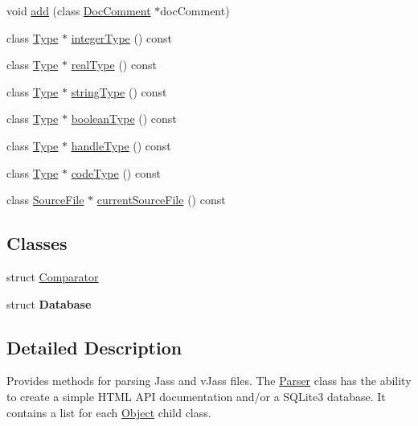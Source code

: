 \begin{CompactItemize}
void \hyperlink{classvjassdoc_1_1Parser_2bb67835019bcb11b1a8cddf6c123a29}{add} (class \hyperlink{classvjassdoc_1_1DocComment}{DocComment} $\ast$docComment)
\item 
class \hyperlink{classvjassdoc_1_1Type}{Type} $\ast$ \hyperlink{classvjassdoc_1_1Parser_b1626fc6672aa818b981e0e4ffc3cd47}{integerType} () const 
\item 
class \hyperlink{classvjassdoc_1_1Type}{Type} $\ast$ \hyperlink{classvjassdoc_1_1Parser_62b691d7ba04b663d6044ede61f4d2dd}{realType} () const 
\item 
class \hyperlink{classvjassdoc_1_1Type}{Type} $\ast$ \hyperlink{classvjassdoc_1_1Parser_3fd0e0dff3afbe71cfd690a3dd872810}{stringType} () const 
\item 
class \hyperlink{classvjassdoc_1_1Type}{Type} $\ast$ \hyperlink{classvjassdoc_1_1Parser_274e561395425aa4286845c2c3b87b69}{booleanType} () const 
\item 
class \hyperlink{classvjassdoc_1_1Type}{Type} $\ast$ \hyperlink{classvjassdoc_1_1Parser_ad227675f854bd07082021316c36b2d1}{handleType} () const 
\item 
class \hyperlink{classvjassdoc_1_1Type}{Type} $\ast$ \hyperlink{classvjassdoc_1_1Parser_afc9cc507b84a07a27dfee8eb1ed896a}{codeType} () const 
\item 
class \hyperlink{classvjassdoc_1_1SourceFile}{SourceFile} $\ast$ \hyperlink{classvjassdoc_1_1Parser_aa986d6eebbef504e87222ff05dc5d33}{currentSourceFile} () const 
\end{CompactItemize}
\subsection*{Classes}
\begin{CompactItemize}
\item 
struct \hyperlink{structvjassdoc_1_1Parser_1_1Comparator}{Comparator}
\item 
struct \textbf{Database}
\end{CompactItemize}


\subsection{Detailed Description}
Provides methods for parsing Jass and vJass files. The \hyperlink{classvjassdoc_1_1Parser}{Parser} class has the ability to create a simple HTML API documentation and/or a SQLite3 database. It contains a list for each \hyperlink{classvjassdoc_1_1Object}{Object} child class. 

